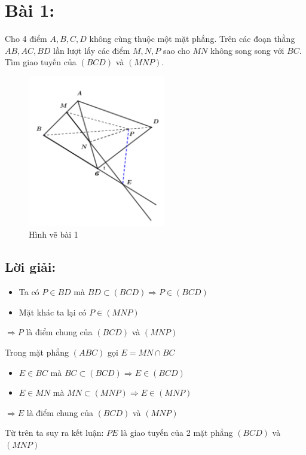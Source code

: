 \section*{Bài 1:}
Cho 4 điểm $A, B, C, D$ không cùng thuộc một mặt phẳng. Trên các đoạn thằng $AB, AC, BD$ lần lượt lấy các điểm $M, N, P$ sao cho $MN$ không song song với $BC$. Tìm giao tuyến của $(BCD)$ và $(MNP)$.
\begin{figure}[H]
\centering
\includegraphics[width=6cm]{images/quizz1/quizz_1_figure.png}
\caption{Hình vẽ bài 1}
\end{figure}

\subsection*{Lời giải:}
\begin{itemize}
\item Ta có $P \in BD$ mà $BD \subset (BCD) \Rightarrow P \in (BCD)$ 
\item Mặt khác ta lại có $ P \in (MNP) $
\end{itemize}
$\Rightarrow P$ là điểm chung của $(BCD)$ và $(MNP)$

\vspace{5mm}
Trong mặt phẳng $(ABC)$ gọi $E = MN \cap BC$
\begin{itemize}
\item $ E \in BC$ mà $BC \subset (BCD) \Rightarrow E \in (BCD)$
\item $ E \in MN$ mà $MN \subset (MNP) \Rightarrow E \in (MNP)$
\end{itemize}
$\Rightarrow E$ là điểm chung của $(BCD)$ và $(MNP)$

\vspace{5mm}
Từ trên ta suy ra kết luận:
$PE$ là giao tuyến của 2 mặt phẳng $(BCD)$ và $(MNP)$